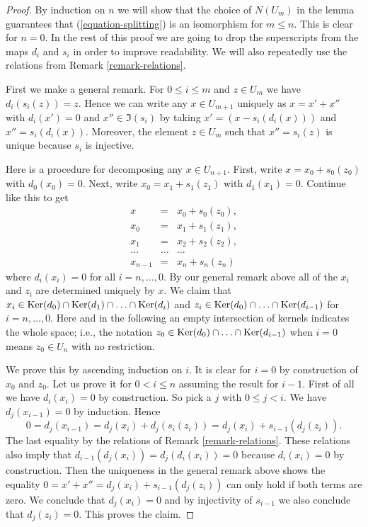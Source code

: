 \begin{proof}
By induction on $n$ we will show that the choice of $N(U_m)$
in the lemma guarantees that (\ref{equation-splitting}) is
an isomorphism for $m \leq n$. This is clear for $n = 0$.
In the rest of this proof we are going to
drop the superscripts from the maps $d_i$ and $s_i$ in order
to improve readability. We will also repeatedly use the relations
from Remark \ref{remark-relations}.

\medskip\noindent
First we make a general remark.
For $0 \leq i \leq m$ and $z \in U_m$ we have
$d_i(s_i(z)) = z$. Hence we can write
any $x \in U_{m + 1}$ uniquely as
$x = x' + x''$ with $d_i(x') = 0$
and $x'' \in \Im(s_i)$
by taking $x' = (x - s_i(d_i(x)))$ and
$x'' = s_i(d_i(x))$. Moreover, the element
$z \in U_m$ such that $x'' = s_i(z)$
is unique because $s_i$ is injective.

\medskip\noindent
Here is a procedure for decomposing any $x \in U_{n + 1}$.
First, write $x = x_0 + s_0(z_0)$ with $d_0(x_0) = 0$.
Next, write $x_0 = x_1 + s_1(z_1)$ with
$d_1(x_1) = 0$. Continue like this to get
\begin{eqnarray*}
x & = & x_0 + s_0(z_0), \\
x_0 & = & x_1 + s_1(z_1), \\
x_1 & = & x_2 + s_2(z_2), \\
\ldots & \ldots & \ldots \\
x_{n - 1} & = & x_n + s_n(z_n)
\end{eqnarray*}
where $d_i(x_i) = 0$ for all $i = n, \ldots, 0$.
By our general remark above all of the $x_i$
and $z_i$ are determined uniquely by $x$.
We claim that
$x_i \in
\mathop{\mathrm{Ker}}(d_0) \cap
\mathop{\mathrm{Ker}}(d_1) \cap
\ldots \cap
\mathop{\mathrm{Ker}}(d_i)$
and
$z_i \in
\mathop{\mathrm{Ker}}(d_0) \cap
\ldots \cap
\mathop{\mathrm{Ker}}(d_{i - 1})$
for $i = n, \ldots, 0$.
Here and in the following
an empty intersection of kernels indicates
the whole space; i.e.,
the notation
$z_0 \in \mathop{\mathrm{Ker}}(d_0) \cap
\ldots \cap
\mathop{\mathrm{Ker}}(d_{i - 1})$
when $i = 0$ means $z_0 \in U_n$ with no restriction.

\medskip\noindent
We prove this by ascending induction on $i$.
It is clear for $i = 0$ by construction of $x_0$ and $z_0$.
Let us prove it for $0 < i \leq n$ assuming the result for $i - 1$.
First of all we have $d_i(x_i) = 0$ by construction.
So pick a $j$ with $0 \leq j < i$. We have
$d_j(x_{i - 1}) = 0$ by induction. Hence
$$
0 = d_j(x_{i - 1})
= d_j(x_i) + d_j(s_i(z_i))
= d_j(x_i) + s_{i - 1}(d_j(z_i)).
$$
The last equality by the relations of Remark \ref{remark-relations}.
These relations also imply that
$d_{i - 1}(d_j(x_i)) = d_j(d_i(x_i)) = 0$
because $d_i(x_i)= 0$ by construction.
Then the uniqueness in the general remark above shows the equality
$0 = x' + x'' = d_j(x_i) + s_{i - 1}(d_j(z_i))$
can only hold if both terms are zero. We conclude that
$d_j(x_i) = 0$ and by injectivity of $s_{i - 1}$ we also
conclude that $d_j(z_i) = 0$. This proves the claim.


\end{proof}
